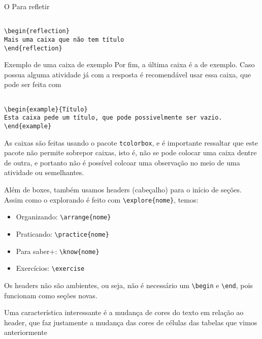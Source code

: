 \begin{reflection}
O Para refletir

\begin{verbatim}

\begin{reflection}
Mais uma caixa que não tem título
\end{reflection}
\end{verbatim}
\end{reflection}

\begin{example}{Exemplo de uma caixa de exemplo}
Por fim, a última caixa é a de exemplo. Caso possua alguma atividade já com a resposta é recomendável usar essa caixa, que pode ser feita com
\begin{verbatim}

\begin{example}{Título}
Esta caixa pede um título, que pode possivelmente ser vazio.
\end{example}
\end{verbatim}
\end{example}

\begin{observation}
As caixas são feitas usando o pacote \verb|tcolorbox|, e é importante ressaltar que este pacote não permite sobrepor caixas, isto é, não se pode colocar uma caixa dentre de outra, e portanto não é possível colcoar uma observação no meio de uma atividade ou semelhantes.
\end{observation}


Além de boxes, também usamos headers (cabeçalho) para o início de seções. Assim como o explorando é feito com \verb|\explore{nome}|, temos:

\begin{itemize}
\item Organizando: \verb|\arrange{nome}|
\item Praticando: \verb|\practice{nome}|
\item Para saber+: \verb|\know{nome}|
\item Exercícios: \verb|\exercise|
\end{itemize}

Os headers não são ambientes, ou seja, não é necessário um \verb|\begin| e \verb|\end|, pois funcionam como seções novas. 

Uma característica interessante é a mudança de cores do texto em relação ao header, que faz justamente a mudança das cores de células das tabelas que vimos anteriormente

